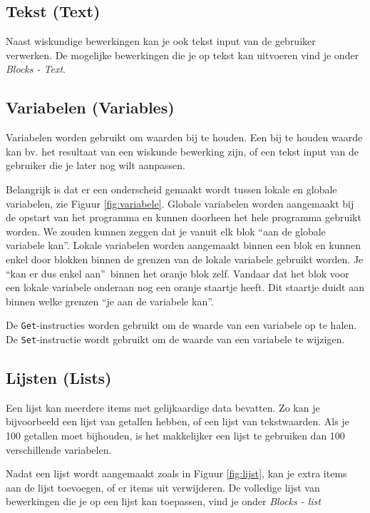 \subsection{Tekst (Text)}
Naast wiskundige bewerkingen kan je ook tekst input van de gebruiker verwerken. De mogelijke bewerkingen die je op tekst kan uitvoeren vind je onder \emph{Blocks - Text}.

\subsection{Variabelen (Variables)}
Variabelen worden gebruikt om waarden bij te houden. Een bij te houden waarde kan bv. het resultaat van een wiskunde bewerking zijn, of een tekst input van de gebruiker die je later nog wilt aanpassen. 

Belangrijk is dat er een onderscheid gemaakt wordt tussen lokale en globale variabelen, zie Figuur \ref{fig:variabele}. Globale variabelen worden aangemaakt bij de opstart van het programma en kunnen doorheen het hele programma gebruikt worden. We zouden kunnen zeggen dat je vanuit elk blok \textquotedblleft aan de globale variabele kan\textquotedblright.
Lokale variabelen worden aangemaakt binnen een blok en kunnen enkel door blokken binnen de grenzen van de lokale variabele gebruikt worden. Je \textquotedblleft kan er dus enkel aan\textquotedblright \ binnen het oranje blok zelf. Vandaar dat het blok voor een lokale variabele onderaan nog een oranje staartje heeft. Dit staartje duidt aan binnen welke grenzen \textquotedblleft je aan de variabele kan\textquotedblright.


De \texttt{Get}-instructies worden gebruikt om de waarde van een variabele op te halen. De \texttt{Set}-instructie wordt gebruikt om de waarde van een variabele te wijzigen.

\subsection{Lijsten (Lists)}
Een lijst kan meerdere items met gelijkaardige data bevatten. Zo kan je bijvoorbeeld een lijst van getallen hebben, of een lijst van tekstwaarden. Als je 100 getallen moet bijhouden, is het makkelijker een lijst te gebruiken dan 100 verschillende variabelen.

Nadat een lijst wordt aangemaakt zoals in Figuur \ref{fig:lijst}, kan je extra items aan de lijst toevoegen, of er items uit verwijderen. De volledige lijst van bewerkingen die je op een lijst kan toepassen, vind je onder \emph{Blocks - list}



